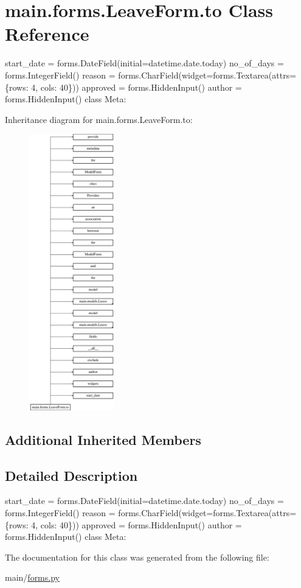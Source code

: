 \hypertarget{classmain_1_1forms_1_1LeaveForm_1_1to}{}\section{main.\+forms.\+Leave\+Form.\+to Class Reference}
\label{classmain_1_1forms_1_1LeaveForm_1_1to}


start\+\_\+date = forms.\+Date\+Field(initial=datetime.\+date.\+today) no\+\_\+of\+\_\+days = forms.\+Integer\+Field() reason = forms.\+Char\+Field(widget=forms.\+Textarea(attrs=\{\textquotesingle{}rows\textquotesingle{}\+: 4, \textquotesingle{}cols\textquotesingle{}\+: 40\})) approved = forms.\+Hidden\+Input() author = forms.\+Hidden\+Input() class Meta\+:  


Inheritance diagram for main.\+forms.\+Leave\+Form.\+to\+:\begin{figure}[H]
\begin{center}
\leavevmode
\includegraphics[height=12.000000cm]{classmain_1_1forms_1_1LeaveForm_1_1to}
\end{center}
\end{figure}
\subsection*{Additional Inherited Members}


\subsection{Detailed Description}
start\+\_\+date = forms.\+Date\+Field(initial=datetime.\+date.\+today) no\+\_\+of\+\_\+days = forms.\+Integer\+Field() reason = forms.\+Char\+Field(widget=forms.\+Textarea(attrs=\{\textquotesingle{}rows\textquotesingle{}\+: 4, \textquotesingle{}cols\textquotesingle{}\+: 40\})) approved = forms.\+Hidden\+Input() author = forms.\+Hidden\+Input() class Meta\+: 

The documentation for this class was generated from the following file\+:\begin{DoxyCompactItemize}
\item 
main/\hyperlink{forms_8py}{forms.\+py}\end{DoxyCompactItemize}

